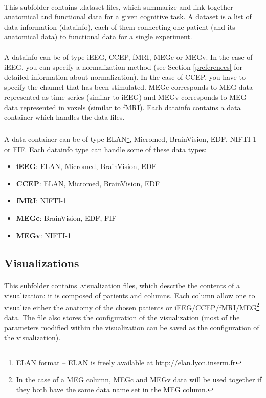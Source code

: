 \documentclass[a4paper]{article}
\begin{document}
\paragraph{} This subfolder contains .dataset files, which summarize and link together anatomical and functional data for a given cognitive task. A dataset is a list of data information (datainfo), each of them connecting one patient (and its anatomical data) to functional data for a single experiment.
\paragraph{} A datainfo can be of type iEEG, CCEP, fMRI, MEGc or MEGv. In the case of iEEG, you can specify a normalization method (see Section \ref{preferences} for detailed information about normalization). In the case of CCEP, you have to specify the channel that has been stimulated. MEGc corresponds to MEG data represented as time series (similar to iEEG) and MEGv corresponds to MEG data represented in voxels (similar to fMRI). Each datainfo contains a data container which handles the data files.
\paragraph{} A data container can be of type ELAN\footnote{\label{ELAN}ELAN format – ELAN is freely available at http://elan.lyon.inserm.fr}, Micromed, BrainVision, EDF, NIFTI-1 or FIF. Each datainfo type can handle some of these data types:
\begin{itemize}
\item \textbf{iEEG}: ELAN, Micromed, BrainVision, EDF
\item \textbf{CCEP}: ELAN, Micromed, BrainVision, EDF
\item \textbf{fMRI}: NIFTI-1
\item \textbf{MEGc}: BrainVision, EDF, FIF
\item \textbf{MEGv}: NIFTI-1
\end{itemize}
\subsection{Visualizations}
\paragraph{} This subfolder contains .visualization files, which describe the contents of a visualization: it is composed of patients and columns. Each column allow one to visualize either the anatomy of the chosen patients or iEEG/CCEP/fMRI/MEG\footnote{\label{MEG}In the case of a MEG column, MEGc and MEGv data will be used together if they both have the same data name set in the MEG column.} data. The file also stores the configuration of the visualization (most of the parameters modified within the visualization can be saved as the configuration of the visualization).
\end{document}
